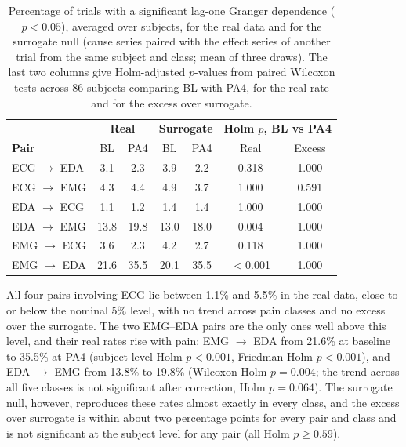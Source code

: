\begin{table}[h]
\centering
\small
\caption{Percentage of trials with a significant lag-one Granger dependence ($p<0.05$), averaged over subjects, for the real data and for the surrogate null (cause series paired with the effect series of another trial from the same subject and class; mean of three draws). The last two columns give Holm-adjusted $p$-values from paired Wilcoxon tests across 86 subjects comparing BL with PA4, for the real rate and for the excess over surrogate.}
\label{tab:granger-controls}
\begin{tabular}{lcccccc}
\hline
 & \multicolumn{2}{c}{\textbf{Real}} & \multicolumn{2}{c}{\textbf{Surrogate}} & \multicolumn{2}{c}{\textbf{Holm $p$, BL vs PA4}} \\
\textbf{Pair} & BL & PA4 & BL & PA4 & Real & Excess \\
\hline
ECG $\rightarrow$ EDA & 3.1 & 2.3 & 3.9 & 2.2 & 0.318 & 1.000 \\
ECG $\rightarrow$ EMG & 4.3 & 4.4 & 4.9 & 3.7 & 1.000 & 0.591 \\
EDA $\rightarrow$ ECG & 1.1 & 1.2 & 1.4 & 1.4 & 1.000 & 1.000 \\
EDA $\rightarrow$ EMG & 13.8 & 19.8 & 13.0 & 18.0 & 0.004 & 1.000 \\
EMG $\rightarrow$ ECG & 3.6 & 2.3 & 4.2 & 2.7 & 0.118 & 1.000 \\
EMG $\rightarrow$ EDA & 21.6 & 35.5 & 20.1 & 35.5 & $<$0.001 & 1.000 \\
\hline
\end{tabular}
\end{table}

All four pairs involving ECG lie between 1.1\% and 5.5\% in the real data, close to or below the nominal 5\% level, with no trend across pain classes and no excess over the surrogate. The two EMG--EDA pairs are the only ones well above this level, and their real rates rise with pain: EMG $\rightarrow$ EDA from 21.6\% at baseline to 35.5\% at PA4 (subject-level Holm $p<0.001$, Friedman Holm $p<0.001$), and EDA $\rightarrow$ EMG from 13.8\% to 19.8\% (Wilcoxon Holm $p=0.004$; the trend across all five classes is not significant after correction, Holm $p=0.064$). The surrogate null, however, reproduces these rates almost exactly in every class, and the excess over surrogate is within about two percentage points for every pair and class and is not significant at the subject level for any pair (all Holm $p\ge0.59$).

